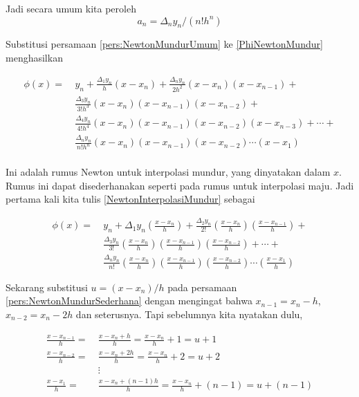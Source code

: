 Jadi secara umum kita peroleh
\begin{equation}\label{pers:NewtonMundurUmum}
a_n = \Delta_n y_n/(n!h^n)
\end{equation}

Substitusi persamaan \ref{pers:NewtonMundurUmum} ke \ref{PhiNewtonMundur} menghasilkan

\begin{equation}
\begin{split}\label{NewtonInterpolasiMundur}
\phi(x) =~& y_n + \frac{\Delta_1 y_n}{h}(x-x_n) + \frac{\Delta_n y_n}{2h^2}(x-x_n)(x-x_{n-1}) +\\
& \frac{\Delta_3 y_n}{3!h^3}(x-x_n)(x-x_{n-1})(x-x_{n-2}) +\\
& \frac{\Delta_4 y_n}{4!h^4}(x-x_n)(x-x_{n-1})(x-x_{n-2})(x-x_{n-3}) + \cdots +\\
& \frac{\Delta_n y_n}{n!h^n}(x-x_n)(x-x_{n-1})(x-x_{n-2})\cdots(x-x_1)\\
\end{split}
\end{equation}

Ini adalah rumus Newton untuk interpolasi mundur, yang dinyatakan dalam $x$. Rumus ini dapat disederhanakan seperti pada rumus untuk interpolasi maju. Jadi pertama kali kita tulis \ref{NewtonInterpolasiMundur} sebagai

\begin{equation}
\begin{split}\label{pers:NewtonMundurSederhana}
\phi(x) =~& y_n + \Delta_1 y_n \left(\frac{x-x_n}{h}\right)+\frac{\Delta_2 y_n}{2!}\left(\frac{x-x_n}{h}\right)\left(\frac{x-x_{n-1}}{h}\right)+\\
& \frac{\Delta_3 y_n}{3!}\left(\frac{x-x_n}{h}\right)\left(\frac{x-x_{n-1}}{h}\right)\left(\frac{x-x_{n-2}}{h}\right)+\cdots+\\
& \frac{\Delta_n y_n}{n!}\left(\frac{x-x_n}{h}\right)\left(\frac{x-x_{n-1}}{h}\right)\left(\frac{x-x_{n-2}}{h}\right)\cdots\left(\frac{x-x_1}{h}\right)
\end{split}
\end{equation}

Sekarang substitusi $u = (x-x_n)/h$ pada persamaan \ref{pers:NewtonMundurSederhana} dengan mengingat bahwa $x_{n-1} = x_n-h$, $x_{n-2} = x_n-2h$ dan seterusnya. Tapi sebelumnya kita nyatakan dulu,

\begin{equation*}
\begin{split}
\frac{x-x_{n-1}}{h} =~& \frac{x-x_n + h}{h} = \frac{x-x_n}{h} + 1 = u + 1\\
\frac{x-x_{n-2}}{h} =~& \frac{x-x_n + 2h}{h} = \frac{x-x_n}{h} + 2 = u + 2\\
&\vdots\\
\frac{x-x_1}{h} =~& \frac{x-x_n + (n-1)h}{h} = \frac{x-x_n}{h} + (n-1) = u + (n-1)\\
\end{split}
\end{equation*}

